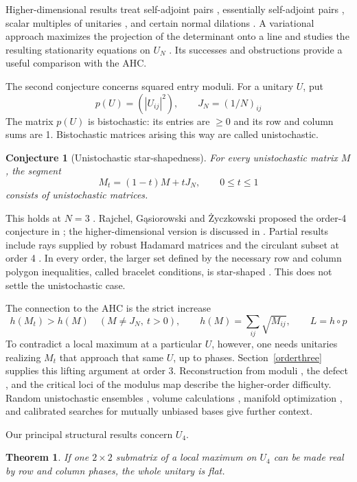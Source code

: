 \documentclass[11pt,a4paper]{article}
\newtheorem*{introconj}{Conjecture}
\newtheorem{introthm}{Theorem}
\begin{document}
Higher-dimensional results treat self-adjoint pairs \cite{F}, essentially
self-adjoint pairs \cite{BKP}, scalar multiples of unitaries \cite{D}, and
certain normal dilations \cite{R}. A variational approach maximizes
the projection of the determinant onto a line and studies the resulting
stationarity equations on $U_N$ \cite{PB,BP}. Its successes and
obstructions \cite{MM} provide a useful comparison with the AHC.

The second conjecture concerns squared entry moduli. For a unitary $U$,
put
\[
 p(U)=(|U_{ij}|^2),\qquad J_N=(1/N)_{ij}
\]
The matrix $p(U)$ is bistochastic: its entries are $\ge0$ and its
row and column sums are 1. Bistochastic matrices arising this way
are called unistochastic.

\begin{introconj}[Unistochastic star-shapedness]
For every unistochastic matrix $M$, the segment
\[
 M_t=(1-t)M+tJ_N,\qquad 0\le t\le1
\]
consists of unistochastic matrices.
\end{introconj}
This holds at $N=3$ \cite{BEKTZ}. Rajchel, G\k{a}siorowski and
\.Zyczkowski proposed the order-4 conjecture in \cite{RGZ}; the
higher-dimensional version is discussed in \cite{RKKZ}. Partial
results include rays supplied by robust Hadamard matrices \cite{RGZ}
and the circulant subset at order 4 \cite{RKKZ}. In every order,
the larger set defined by the necessary row and column polygon
inequalities, called bracelet conditions, is star-shaped \cite{RKKZ}.
This does not settle the unistochastic case.

The connection to the AHC is the strict increase
\[
 h(M_t)>h(M)\quad(M\ne J_N,\ t>0),\qquad
 h(M)=\sum_{ij}\sqrt{M_{ij}},\qquad L=h\circ p
\]
To contradict a local maximum at a particular $U$, however, one needs
unitaries realizing $M_t$ that approach that same $U$, up to phases.
Section~\ref{orderthree} supplies this lifting argument at order 3.
Reconstruction from moduli \cite{AMM}, the defect \cite{TZ}, and the
critical loci of the modulus map \cite{BebN} describe the higher-order
difficulty. Random unistochastic ensembles \cite{ZKSS}, volume
calculations \cite{DZ}, manifold optimization \cite{AMS}, and calibrated
searches for mutually unbiased bases \cite{BW} give further context.

Our principal structural results concern $U_4$.

\begin{introthm}
If one $2\times2$ submatrix of a local maximum on $U_4$ can be made
real by row and column phases, the whole unitary is flat.
\end{introthm}
\end{document}
